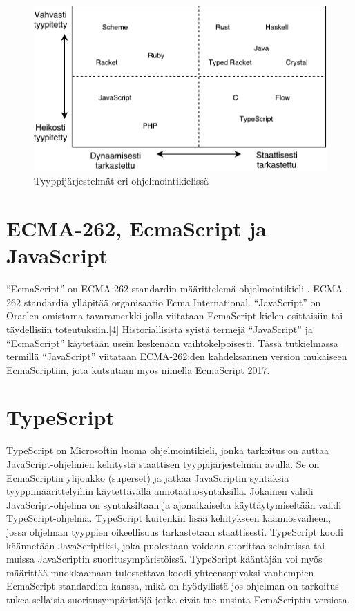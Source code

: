 \begin{figure}
\centering
\includegraphics{images/type-systems.pdf}
\caption{Tyyppijärjestelmät eri ohjelmointikielissä}
\end{figure}

\section{ECMA-262, EcmaScript ja JavaScript}
``EcmaScript'' on ECMA-262 standardin määrittelemä ohjelmointikieli
\cite{JavaScriptLanguageResources}\cite{Ecma262}.
ECMA-262 standardia ylläpitää organisaatio Ecma International. ``JavaScript''
on Oraclen omistama tavaramerkki jolla viitataan EcmaScript-kielen
osittaisiin tai täydellisiin toteutuksiin.[4] Historiallisista syistä termejä
``JavaScript'' ja ``EcmaScript'' käytetään usein keskenään vaihtokelpoisesti.
Tässä tutkielmassa termillä ``JavaScript'' viitataan ECMA-262:den kahdeksannen
version mukaiseen EcmaScriptiin, jota kutsutaan myös nimellä EcmaScript 2017.

\section{TypeScript}
TypeScript on Microsoftin luoma ohjelmointikieli, jonka tarkoitus on
auttaa JavaScript-ohjelmien kehitystä staattisen tyyppijärjestelmän avulla.
Se on EcmaScriptin ylijoukko (superset)\cite{TypeScriptSpec} ja jatkaa
JavaScriptin syntaksia tyyppimäärittelyihin käytettävällä
annotaatiosyntaksilla. Jokainen validi JavaScript-ohjelma on syntaksiltaan ja
ajonaikaiselta käyttäytymiseltään validi TypeScript-ohjelma. TypeScript
kuitenkin lisää kehitykseen käännösvaiheen, jossa ohjelman tyyppien
oikeellisuus tarkastetaan staattisesti. TypeScript koodi käännetään
JavaScriptiksi, joka puolestaan voidaan suorittaa selaimissa tai muissa
JavaScriptin suoritusympäristöissä. TypeScript kääntäjän voi myös määrittää
muokkaamaan tulostettava koodi yhteensopivaksi vanhempien
EcmaScript-standardien kanssa, mikä on hyödyllistä jos ohjelman on tarkoitus
tukea sellaisia suoritusympäristöjä jotka eivät tue uusinta EcmaScriptin
versiota.

